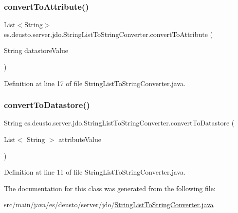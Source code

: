 \subsubsection{\texorpdfstring{convertToAttribute()}{convertToAttribute()}}
{\footnotesize\ttfamily List$<$String$>$ es.\+deusto.\+server.\+jdo.\+String\+List\+To\+String\+Converter.\+convert\+To\+Attribute (\begin{DoxyParamCaption}\item[{String}]{datastore\+Value }\end{DoxyParamCaption})}



Definition at line 17 of file String\+List\+To\+String\+Converter.\+java.

\mbox{\label{classes_1_1deusto_1_1server_1_1jdo_1_1_string_list_to_string_converter_a97a5081037fd91b4787b2c9cc8992c5f}} 
\subsubsection{\texorpdfstring{convertToDatastore()}{convertToDatastore()}}
{\footnotesize\ttfamily String es.\+deusto.\+server.\+jdo.\+String\+List\+To\+String\+Converter.\+convert\+To\+Datastore (\begin{DoxyParamCaption}\item[{List$<$ String $>$}]{attribute\+Value }\end{DoxyParamCaption})}



Definition at line 11 of file String\+List\+To\+String\+Converter.\+java.



The documentation for this class was generated from the following file\+:\begin{DoxyCompactItemize}
\item 
src/main/java/es/deusto/server/jdo/\mbox{\hyperlink{_string_list_to_string_converter_8java}{String\+List\+To\+String\+Converter.\+java}}\end{DoxyCompactItemize}

